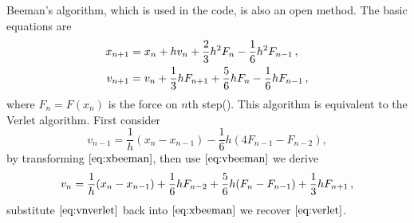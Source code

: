 Beeman's algorithm, which is used in the code, is also an open method.
The basic equations are
\begin{subequations}
	\begin{align}
		x_{n+1} & = x_n + h v_n + \frac{ 2 }{ 3 } h^2 F_n - \frac{ 1 }{ 6 } h^2 F_{n-1} \thinspace,
		\label{eq:xbeeman}\\
		v_{n+1} & = v_n + \frac{ 1 }{ 3 }h F_{n+1} + \frac{ 5 }{ 6 } h F_n - \frac{ 1 }{ 6 } h F_{n-1}
		\thinspace,
		\label{eq:vbeeman}
	\end{align}
\end{subequations}
where $F_n = F(x_n)$ is the force on $n$th step(\cite{dufty1986molecular}). This algorithm
is equivalent to the Verlet algorithm. First consider
\begin{equation}
	v_{n-1} = \frac{ 1 }{ h }(x_n - x_{n-1}) - \frac{ 1 }{ 6 } h (4 F_{n-1} - F_{n-2}),
\end{equation}
by transforming $\eqref{eq:xbeeman}$, then use $\eqref{eq:vbeeman}$ we derive
\begin{equation}\label{eq:vnverlet}
	v_n = \frac{ 1 }{ h }(x_n - x_{n-1}) + \frac{ 1 }{ 6 } h F_{n-2} + \frac{ 5 }{ 6 } h (F_n - F_{n-1})
	+ \frac{ 1 }{ 3 }h F_{n+1} \thinspace,
\end{equation}
substitute $\eqref{eq:vnverlet}$ back into $\eqref{eq:xbeeman}$ we recover $\eqref{eq:verlet}$.
